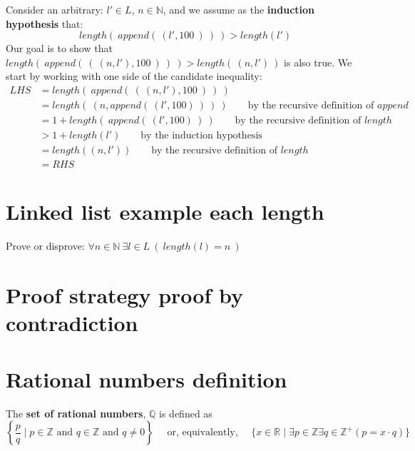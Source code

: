 \documentclass[12pt, oneside]{article}
\begin{document}
Consider an arbitrary: $l' \in L$, $n \in \mathbb{N}$, and we  assume
as the {\bf induction hypothesis} that:
\[
length(~append(~(l', 100~)~)~) > length(l')
\]
Our goal is to show that $length(~append( ~(~(n,l'), 100~)~)~) > length(~(n,l')~)$ is also true. 
We start by working with
one side of the candidate inequality:
\begin{align*}
LHS &= length(~append( ~(~ (n,l'), 100~)~)~) \\
&= length(~(n, append(~(l', 100)~)~ )~) \qquad \text{by the recursive definition of $append$}\\
&= 1 + length(~ append(~(l', 100)~) ~) \qquad \text{by the recursive definition of $length$}\\
&> 1+ length(l')  \qquad \text{by the induction hypothesis}\\
&= length( (n,l') )  \qquad \text{by the recursive definition of $length$}\\
&= RHS 
\end{align*} \vfill
\section*{Linked list example each length}


Prove or disprove: $\forall n \in \mathbb{N} ~\exists l \in L ~(~length(l) = n~)$

\vspace{300pt} \vfill
\section*{Proof strategy proof by contradiction}



 \vfill
\section*{Rational numbers definition}


The {\bf set  of rational numbers}, $\mathbb{Q}$  is defined as 
\[
\left\{ \frac{p}{q} \mid p \in \mathbb{Z}  \text{ and  } q  \in \mathbb{Z} \text{ and } q \neq  0 \right\}
\text{~~~~or, equivalently,~~~~}
\{ x  \in  \mathbb{R} \mid \exists p \in \mathbb{Z}  \exists q \in \mathbb{Z}^+ ( p =  x \cdot q) \}
\]
\end{document}
